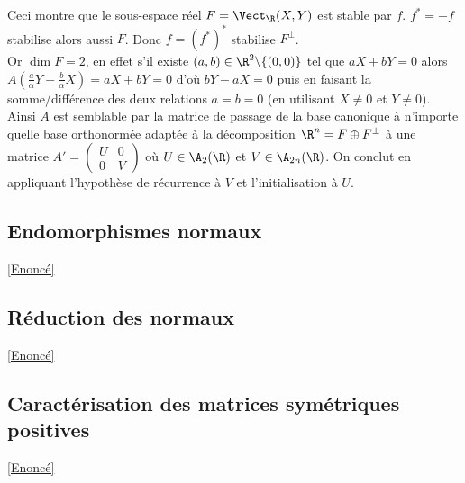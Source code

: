 \documentclass[8pt]{book}
\begin{document}
	Ceci montre que le sous-espace réel $F=\Vect_\R(X,Y)$ est stable par $f$. $f^*=-f$ stabilise alors aussi $F$. Donc $f=(f^*)^*$ stabilise $F^\bot$.\\
	Or $\dim F=2$, en effet s'il existe $(a,b)\in \R^2\backslash\{(0,0)\}$ tel que $aX+bY=0$ alors $\displaystyle A\left(\frac{a}{\alpha}Y-\frac{b}{\alpha}X\right)=aX+bY=0$ d'où $bY-aX=0$ puis en faisant la somme/différence des deux relations $a=b=0$ (en utilisant $X\ne 0$ et $Y\ne 0$).\\
	Ainsi $A$ est semblable par la matrice de passage de la base canonique à n'importe quelle base orthonormée adaptée à la décomposition $\R^n=F\oplus F^\bot$ à une matrice $A'=\begin{pmatrix}
		U&0\\
		0&V
	\end{pmatrix}$ où $U\in \A_2(\R)$ et $V\in \A_{2n}(\R)$. On conclut en appliquant l'hypothèse de récurrence à $V$ et l'initialisation à $U$.
	
	\subsection{Endomorphismes normaux}
	\label{Endomorphismes normaux corrigé}
	\textcolor{blue}{\hyperref[Endomorphismes normaux]{[Enoncé]}}\\
	
	\subsection{Réduction des normaux}
	\label{Réduction des normaux corrigé}
	\textcolor{blue}{\hyperref[Réduction des normaux]{[Enoncé]}}\\
	
	\subsection{Caractérisation des matrices symétriques positives}
	\label{Caractérisation des matrices symétriques positives corrigé}
	\textcolor{blue}{\hyperref[Caractérisation des matrices symétriques positives]{[Enoncé]}}\\
	
\end{document}

